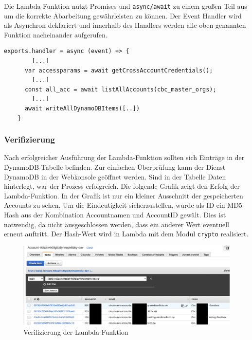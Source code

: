Die Lambda-Funktion nutzt Promises und \verb+async/await+ zu einem großen Teil aus um die korrekte Abarbeitung gewährleisten zu können.
Der Event Handler wird als Asynchron deklariert und innerhalb des Handlers werden alle oben genannten Funktion nacheinander aufgerufen.

\begin{lstlisting}[basicstyle=\ttfamily\small, breaklines=true , frame = single, backgroundcolor=\color{flashwhite}, caption={Beispiel zum asynchronen Funktionsaufruf (Datei: \textit{\nameref{lst:LambdaCode}})} ]
    exports.handler = async (event) => {
        [...]
      var accessparams = await getCrossAccountCredentials();
        [...]
      const all_acc = await listAllAccounts(cbc_master_orgs);
        [...]
      await writeAllDynamoDBItems([..])
    }
    \end{lstlisting}
\clearpage
\subsubsection{Verifizierung}

Nach erfolgreicher Ausführung der Lambda-Funktion sollten sich Einträge in der DynamoDB-Tabelle befinden.
Zur einfachen Überprüfung kann der Dienst DynamoDB in der Webkonsole geöffnet werden.
Sind in der Tabelle Daten hinterlegt, war der Prozess erfolgreich.
Die folgende Grafik zeigt den Erfolg der Lambda-Funktion.
In der Grafik ist nur ein kleiner Ausschnitt der gespeicherten Accounts zu sehen.
Um die Eindeutigkeit sicherzustellen, wurde als ID ein MD5-Hash aus der Kombination Accountnamen und AccountID gewält.
Dies ist notwendig, da nicht ausgeschlossen werden, dass ein anderer Wert eventuell erneut auftritt.
Der Hash-Wert wird in Lambda mit dem Modul \verb+crypto+ realisiert.

\begin{figure}[htbp]
    \centering
    \includegraphics[width=1.0\textwidth]{50-Implementierung/DynamoWeb.png}
    \caption{Verifizierung der Lambda-Funktion}
    \label{fig:meine-grafik}
\end{figure}


